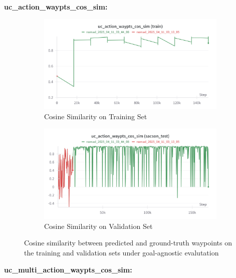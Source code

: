 \documentclass[12pt]{article}
\begin{document}
\noindent \textbf{uc\_action\_waypts\_cos\_sim:}\\
\begin{figure}[H]
    \centering
    \begin{subfigure}[b]{0.48\textwidth}
        \centering
        \includegraphics[width=\textwidth]{images/uc_action_sim_train(1).png}
        \caption{Cosine Similarity on Training Set}
        \label{fig:uc_action_waypts_cos_sim_train}
    \end{subfigure}
    \hfill
    \begin{subfigure}[b]{0.48\textwidth}
        \centering
        \includegraphics[width=\textwidth]{images/uc_action_sim_test.png}
        \caption{Cosine Similarity on Validation Set}
        \label{fig:uc_action_waypts_cos_sim_val}
    \end{subfigure}
    \caption{Cosine similarity between predicted and ground-truth waypoints on the training and validation sets under goal-agnostic evalutation}
\end{figure}
\newpage
\noindent \textbf{uc\_multi\_action\_waypts\_cos\_sim:}\\
\end{document}

